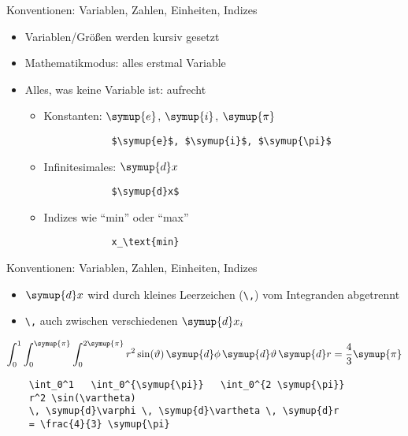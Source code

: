 \begin{frame}[fragile]{Konventionen: Variablen, Zahlen, Einheiten, Indizes}
  \begin{itemize}
    \item Variablen/Größen werden kursiv gesetzt
    \item Mathematikmodus: alles erstmal Variable
    \item Alles, was keine Variable ist: aufrecht
      \begin{itemize}
        \item Konstanten: $\symup{e}$, $\symup{i}$, $\symup{\pi}$
          \smallskip
          \begin{lstlisting}
            $\symup{e}$, $\symup{i}$, $\symup{\pi}$
          \end{lstlisting}
          \medskip
        \item Infinitesimales: $\symup{d}x$
          \smallskip
          \begin{lstlisting}
            $\symup{d}x$
          \end{lstlisting}
          \medskip
        \item Indizes wie \enquote{min} oder \enquote{max}
          \smallskip
          \begin{lstlisting}
            x_\text{min}
          \end{lstlisting}
      \end{itemize}
  \end{itemize}
\end{frame}

\begin{frame}[fragile]{Konventionen: Variablen, Zahlen, Einheiten, Indizes}
  \begin{itemize}
    \item $\symup{d}x$ wird durch kleines Leerzeichen (\verb+\,+) vom Integranden abgetrennt
    \item \verb+\,+ auch zwischen verschiedenen $\symup{d}x_i$
  \end{itemize}

  \begin{equation*}
    \int_0^1 \int_0^{\symup{\pi}} \int_0^{2 \symup{\pi}}
    r^2 \sin(\vartheta) \,
    \symup{d}\phi \, \symup{d}\vartheta \, \symup{d}r
    = \frac{4}{3} \symup{\pi}
  \end{equation*}

  \vspace{1em}
  \begin{lstlisting}
    \int_0^1   \int_0^{\symup{\pi}}   \int_0^{2 \symup{\pi}}
    r^2 \sin(\vartheta)
    \, \symup{d}\varphi \, \symup{d}\vartheta \, \symup{d}r
    = \frac{4}{3} \symup{\pi}
  \end{lstlisting}
\end{frame}

